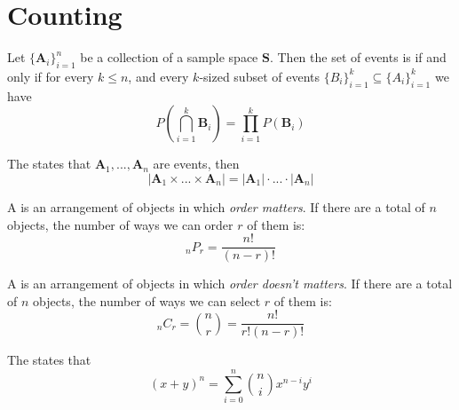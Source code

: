 \documentclass[12pt]{report}
\begin{document}
\section{Counting}

\begin{prop}{}{}
    Let $\{\mathbf{A}_i\}_{i=1}^n$ be a collection of a sample space $\mathbf{S}$. Then the set of events is  if and only if for every $k \leq n$, and every $k$-sized subset of events $\{B_i\}_{i=1}^k\subseteq \{A_i\}_{i=1}^k$ we have \begin{equation*}
        P\left(\bigcap_{i=1}^k\mathbf{B}_i\right) = \prod\limits_{i=1}^kP(\mathbf{B}_i)
    \end{equation*}
\end{prop}

\begin{prop}{}{}
    The  states that $\mathbf{A}_1,...,\mathbf{A}_n$ are events, then \begin{equation*}
        |\mathbf{A}_1\times...\times\mathbf{A}_n| = |\mathbf{A}_1|\cdot...\cdot|\mathbf{A}_n|
    \end{equation*}
\end{prop}


\begin{defn}{}{}
    A  is an arrangement of objects in which \emph{order matters}. If there are a total of $n$ objects, the number of ways we can order $r$ of them is: \begin{equation*}
        {}_{n}P_{r} = \frac{n!}{(n-r)!}
    \end{equation*}
\end{defn}



\begin{defn}{}{}
    A  is an arrangement of objects in which \emph{order doesn't matters}. If there are a total of $n$ objects, the number of ways we can select $r$ of them is: \begin{equation*}
        {}_{n}C_{r} = \binom{n}{r} =  \frac{n!}{r!(n-r)!}
    \end{equation*}
\end{defn}


\begin{thm}{}{}
    The  states that \begin{equation*}
        (x+y)^n = \sum\limits_{i=0}^n\binom{n}{i}x^{n-i}y^i
    \end{equation*}
\end{thm}
\end{document}
